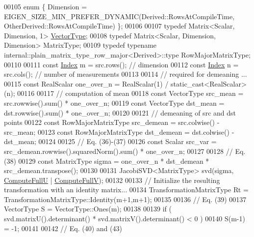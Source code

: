\begin{DoxyCode}
00105   \textcolor{keyword}{enum} \{ Dimension = EIGEN\_SIZE\_MIN\_PREFER\_DYNAMIC(Derived::RowsAtCompileTime, 
      OtherDerived::RowsAtCompileTime) \};
00106 
00107   \textcolor{keyword}{typedef} Matrix<Scalar, Dimension, 1> \hyperlink{struct_vector_type}{VectorType};
00108   \textcolor{keyword}{typedef} Matrix<Scalar, Dimension, Dimension> MatrixType;
00109   \textcolor{keyword}{typedef} \textcolor{keyword}{typename} internal::plain\_matrix\_type\_row\_major<Derived>::type RowMajorMatrixType;
00110 
00111   \textcolor{keyword}{const} \hyperlink{namespace_eigen_a62e77e0933482dafde8fe197d9a2cfde}{Index} m = src.rows(); \textcolor{comment}{// dimension}
00112   \textcolor{keyword}{const} \hyperlink{namespace_eigen_a62e77e0933482dafde8fe197d9a2cfde}{Index} n = src.cols(); \textcolor{comment}{// number of measurements}
00113 
00114   \textcolor{comment}{// required for demeaning ...}
00115   \textcolor{keyword}{const} RealScalar one\_over\_n = RealScalar(1) / \textcolor{keyword}{static\_cast<}RealScalar\textcolor{keyword}{>}(n);
00116 
00117   \textcolor{comment}{// computation of mean}
00118   \textcolor{keyword}{const} VectorType src\_mean = src.rowwise().sum() * one\_over\_n;
00119   \textcolor{keyword}{const} VectorType dst\_mean = dst.rowwise().sum() * one\_over\_n;
00120 
00121   \textcolor{comment}{// demeaning of src and dst points}
00122   \textcolor{keyword}{const} RowMajorMatrixType src\_demean = src.colwise() - src\_mean;
00123   \textcolor{keyword}{const} RowMajorMatrixType dst\_demean = dst.colwise() - dst\_mean;
00124 
00125   \textcolor{comment}{// Eq. (36)-(37)}
00126   \textcolor{keyword}{const} Scalar src\_var = src\_demean.rowwise().squaredNorm().sum() * one\_over\_n;
00127 
00128   \textcolor{comment}{// Eq. (38)}
00129   \textcolor{keyword}{const} MatrixType sigma = one\_over\_n * dst\_demean * src\_demean.transpose();
00130 
00131   JacobiSVD<MatrixType> svd(sigma, \hyperlink{group__enums_ggae3e239fb70022eb8747994cf5d68b4a9a2b4f91ca5859a4159dbfe8090043817f}{ComputeFullU} | \hyperlink{group__enums_ggae3e239fb70022eb8747994cf5d68b4a9a52c6f7e80bbf9a42297c88f700245b51}{ComputeFullV});
00132 
00133   \textcolor{comment}{// Initialize the resulting transformation with an identity matrix...}
00134   TransformationMatrixType Rt = TransformationMatrixType::Identity(m+1,m+1);
00135 
00136   \textcolor{comment}{// Eq. (39)}
00137   VectorType S = VectorType::Ones(m);
00138 
00139   \textcolor{keywordflow}{if}  ( svd.matrixU().determinant() * svd.matrixV().determinant() < 0 )
00140     S(m-1) = -1;
00141 
00142   \textcolor{comment}{// Eq. (40) and (43)}

\end{DoxyCode}
